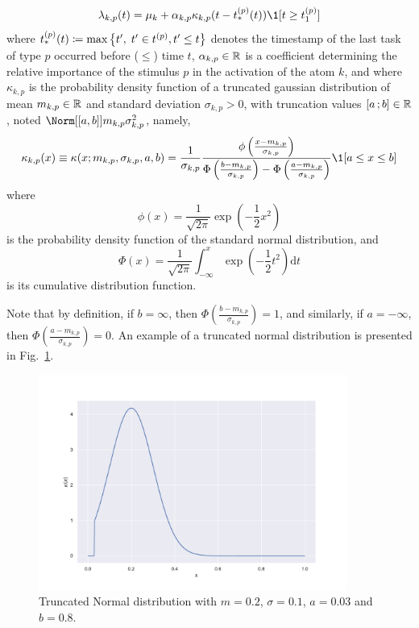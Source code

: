 \begin{equation}\label{eq:model_intensity}
    \lambda_{k,p}(t)  = \mu_k + \alpha_{k,p}\kappa_{k,p}(t - t_*^{(p)}(t))\1[t \geq t_1^{(p)}]
\end{equation}
where $t_*^{(p)}(t) \coloneqq \max\left\lbrace t',\; t' \in t^{(p)}, t' \leq t \right\rbrace$ denotes the timestamp of the last task of type $p$ occurred before ($\leq$) time $t$, $\alpha_{k,p}\in\mathbb{R}$ is a coefficient determining the relative importance of the stimulus $p$ in the activation of the atom $k$, and where $\kappa_{k,p}$ is the probability density function of a truncated gaussian distribution of mean $m_{k,p}\in\mathbb{R}$ and standard deviation $\sigma_{k,p}>0$, with truncation values $\left[ a \, ; b \right]\in\mathbb{R}$, noted $\Norm[\bracks{a,b}]{m_{k,p}}{\sigma_{k,p}^2}$, namely,
\begin{equation}\label{eq:kernel_trunc_norm}
    \kappa_{k,p}(x) \equiv \kappa(x ; m_{k,p}, \sigma_{k,p}, a, b)=\frac{1}{\sigma_{k,p}} \frac{\phi\left(\frac{x-m_{k,p}}{\sigma_{k,p}}\right)}{\Phi\left(\frac{b-m_{k,p}}{\sigma_{k,p}}\right)-\Phi\left(\frac{a-m_{k,p}}{\sigma_{k,p}}\right)} \1[a\leq x\leq b]
\end{equation}
where
$$
\phi(x) = \frac{1}{\sqrt{2\pi}}\exp\left(-\frac{1}{2}x^2\right)
$$ 
is the probability density function of the standard normal distribution, and
$$
\Phi(x) = \frac{1}{\sqrt{2\pi}} \int_{-\infty}^x \exp\left(-\frac{1}{2}t^2\right) \mathrm{d}t
$$
is its cumulative distribution function.

Note that by definition, if $b=\infty$, then $\Phi\left(\frac{b-m_{k,p}}{\sigma_{k,p}}\right) = 1$, and similarly, if $a=-\infty$, then $\Phi\left(\frac{a-m_{k,p}}{\sigma_{k,p}}\right) = 0$.
An example of a truncated normal distribution is presented in Fig.~\ref{fig:trunc_norm_distribution}.

\begin{figure}[h!]
    \centering
    \includegraphics[width=0.9\textwidth]{pics/trunc_norm_distribution.pdf}
    \caption{Truncated Normal distribution with $m=\num{0.2}$, $\sigma=0.1$, $a=0.03$ and $b=0.8$.}
    \label{fig:trunc_norm_distribution}
\end{figure}